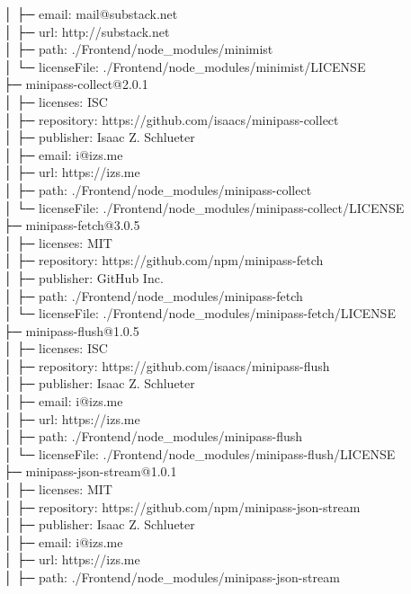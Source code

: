 │  ├─ email: mail@substack.net\\
│  ├─ url: http://substack.net\\
│  ├─ path: ./Frontend/node\_modules/minimist\\
│  └─ licenseFile: ./Frontend/node\_modules/minimist/LICENSE\\
├─ minipass-collect@2.0.1\\
│  ├─ licenses: ISC\\
│  ├─ repository: https://github.com/isaacs/minipass-collect\\
│  ├─ publisher: Isaac Z. Schlueter\\
│  ├─ email: i@izs.me\\
│  ├─ url: https://izs.me\\
│  ├─ path: ./Frontend/node\_modules/minipass-collect\\
│  └─ licenseFile: ./Frontend/node\_modules/minipass-collect/LICENSE\\
├─ minipass-fetch@3.0.5\\
│  ├─ licenses: MIT\\
│  ├─ repository: https://github.com/npm/minipass-fetch\\
│  ├─ publisher: GitHub Inc.\\
│  ├─ path: ./Frontend/node\_modules/minipass-fetch\\
│  └─ licenseFile: ./Frontend/node\_modules/minipass-fetch/LICENSE\\
├─ minipass-flush@1.0.5\\
│  ├─ licenses: ISC\\
│  ├─ repository: https://github.com/isaacs/minipass-flush\\
│  ├─ publisher: Isaac Z. Schlueter\\
│  ├─ email: i@izs.me\\
│  ├─ url: https://izs.me\\
│  ├─ path: ./Frontend/node\_modules/minipass-flush\\
│  └─ licenseFile: ./Frontend/node\_modules/minipass-flush/LICENSE\\
├─ minipass-json-stream@1.0.1\\
│  ├─ licenses: MIT\\
│  ├─ repository: https://github.com/npm/minipass-json-stream\\
│  ├─ publisher: Isaac Z. Schlueter\\
│  ├─ email: i@izs.me\\
│  ├─ url: https://izs.me\\
│  ├─ path: ./Frontend/node\_modules/minipass-json-stream\\

